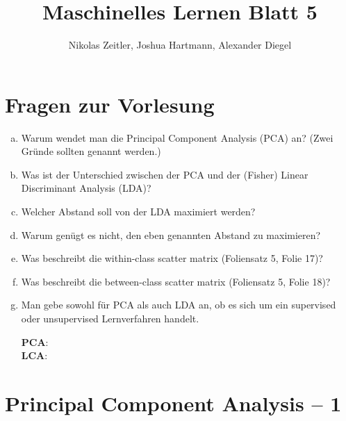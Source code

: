 \documentclass[a4paper]{scrartcl}
\author{Nikolas Zeitler, Joshua Hartmann, Alexander Diegel}
\title{Maschinelles Lernen Blatt 5}
\begin{document}
\maketitle
\section{Fragen zur Vorlesung}

\begin{enumerate}[a)]
	\item Warum wendet man die Principal Component Analysis (PCA) an? (Zwei Gründe sollten genannt werden.)
	
	\item Was ist der Unterschied zwischen der PCA und der (Fisher) Linear Discriminant Analysis (LDA)?
	
	\item Welcher Abstand soll von der LDA maximiert werden?
	
	\item Warum genügt es nicht, den eben genannten Abstand zu maximieren?
	
	\item Was beschreibt die within-class scatter matrix (Foliensatz 5, Folie 17)?
	
	\item Was beschreibt die between-class scatter matrix (Foliensatz 5, Folie 18)?
	
	\item Man gebe sowohl für PCA als auch LDA an, ob es sich um ein supervised oder unsupervised Lernverfahren
	handelt.
	
	\textbf{PCA}: \\
	\textbf{LCA}:
	
\end{enumerate}

\newpage

\section{Principal Component Analysis – 1}
\end{document}
